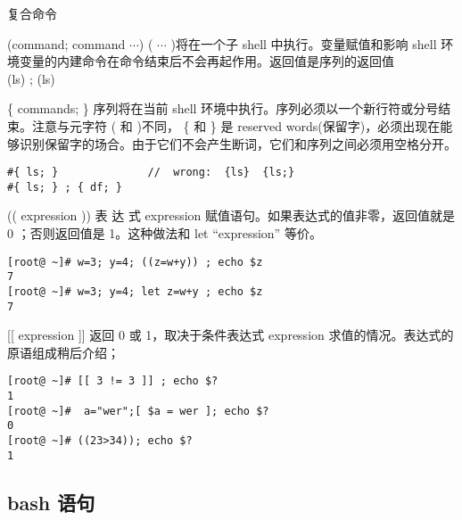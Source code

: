 \begin{frame}{复合命令}
\begin{block}{(command; command $\cdots$)}
( $ \cdots $ )将在一个子 shell 中执行。变量赋值和影响 shell 环境变量的内建命令在命令结束后不会再起作用。返回值是序列的返回值 \\
(ls) ;  (ls)
\end{block}

\newpage

\begin{block}{\{ commands; \} }
序列将在当前 shell 环境中执行。序列必须以一个新行符或分号结束。注意与元字符 ( 和 )不同， \{ 和 \} 是 reserved words(保留字)，必须出现在能够识别保留字的场合。由于它们不会产生断词，它们和序列之间必须用空格分开。
\begin{verbatim}
#{ ls; }              //  wrong:  {ls}  {ls;}
#{ ls; } ; { df; }
\end{verbatim}
\end{block}

\newpage

\begin{block}{(( expression )) }
表 达 式 expression 赋值语句。如果表达式的值非零，返回值就是  0 ；否则返回值是 1。这种做法和 let “expression” 等价。
\begin{verbatim}
[root@ ~]# w=3; y=4; ((z=w+y)) ; echo $z
7
[root@ ~]# w=3; y=4; let z=w+y ; echo $z
7
\end{verbatim}
\end{block}

\newpage

\begin{block}{[[ expression ]] }
返回 0 或 1，取决于条件表达式 expression 求值的情况。表达式的原语组成稍后介绍；
\begin{verbatim}
[root@ ~]# [[ 3 != 3 ]] ; echo $?
1
[root@ ~]#  a="wer";[ $a = wer ]; echo $?
0
[root@ ~]# ((23>34)); echo $?
1
\end{verbatim}
\end{block}
\end{frame}

\subsection{bash 语句}

